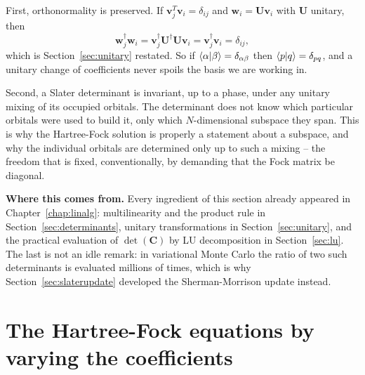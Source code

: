 First, orthonormality is preserved.  If $\bm{v}_j^{T}\bm{v}_i=\delta_{ij}$ and
$\bm{w}_i=\bm{U}\bm{v}_i$ with $\bm{U}$ unitary, then
\begin{equation}
  \bm{w}_j^{\dagger}\bm{w}_i
  = \bm{v}_j^{\dagger}\bm{U}^{\dagger}\bm{U}\bm{v}_i
  = \bm{v}_j^{\dagger}\bm{v}_i = \delta_{ij},
  \label{eq:6-unitarypreserves}
\end{equation}
which is Section~\ref{sec:unitary} restated.  So if $\langle \alpha \vert \beta \rangle
=\delta_{\alpha\beta}$ then $\langle p \vert q \rangle=\delta_{pq}$, and a unitary change
of coefficients never spoils the basis we are working in.

Second, a Slater determinant is invariant, up to a phase, under any unitary
mixing of its occupied orbitals.  The determinant does not know which
particular orbitals were used to build it, only which $N$-dimensional subspace
they span.  This is why the Hartree-Fock solution is properly a statement
about a subspace, and why the individual orbitals are determined only up to
such a mixing -- the freedom that is fixed, conventionally, by demanding that
the Fock matrix be diagonal.

\begin{notebox}
\textbf{Where this comes from.}  Every ingredient of this section already
appeared in Chapter~\ref{chap:linalg}: multilinearity and the product rule
in Section~\ref{sec:determinants}, unitary transformations in
Section~\ref{sec:unitary}, and the practical evaluation of
$\det(\bm{C})$ by LU decomposition in Section~\ref{sec:lu}.  The last is not
an idle remark: in variational Monte Carlo the ratio of two such determinants
is evaluated millions of times, which is why
Section~\ref{sec:slaterupdate} developed the Sherman-Morrison update instead.
\end{notebox}

\section{The Hartree-Fock equations by varying the coefficients}
\label{sec:hfcoefficients}


